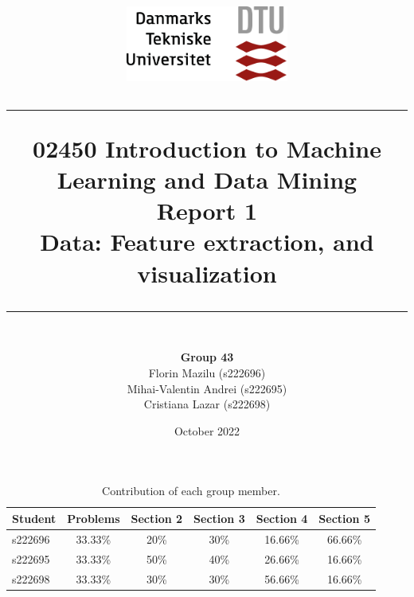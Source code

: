 \documentclass[12pt]{article}
\title{
    
    {\includegraphics[width=0.4\textwidth]{dtu_logo.png}}\\
    \vspace{1.5cm}
    \hrule 
    \vspace{1cm}
    \large 02450 Introduction to Machine Learning and Data Mining \\ 
    \vspace{1cm}
    \textbf{Report 1} \\
    \text Data: Feature extraction, and visualization
    \vspace{1cm} 
    \hrule
    \vspace{9cm}
}
\author{\\\textbf{Group 43} \\ Florin Mazilu (s222696) \\ Mihai-Valentin Andrei (s222695)\\Cristiana Lazar (s222698)}
\date{ October 2022}
\begin{document}
\maketitle


\begin{table}[H]
\begin{tabular}{|l|c|c|c|c|c|}
\hline
Student & Problems & Section 2 & Section 3 & Section 4 & Section 5 \\ \hline
s222696 & 33.33\% & 20\% & 30\% & 16.66\% & 66.66\% \\ \hline
s222695 & 33.33\% & 50\% & 40\% & 26.66\% & 16.66\% \\ \hline
s222698 & 33.33\% & 30\% & 30\% & 56.66\% & 16.66\% \\ \hline
\end{tabular}
\caption{Contribution of each group member.}
\label{table:1}
\end{table}
\tableofcontents
\listoffigures
\listoftables
\newpage
\end{document}
